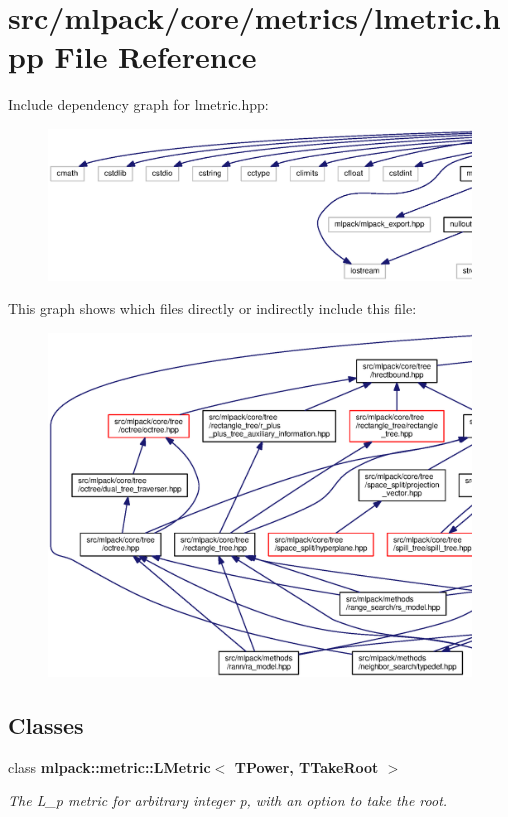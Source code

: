 \section{src/mlpack/core/metrics/lmetric.hpp File Reference}
\label{lmetric_8hpp}
Include dependency graph for lmetric.\+hpp\+:
\nopagebreak
\begin{figure}[H]
\begin{center}
\leavevmode
\includegraphics[width=350pt]{lmetric_8hpp__incl}
\end{center}
\end{figure}
This graph shows which files directly or indirectly include this file\+:
\nopagebreak
\begin{figure}[H]
\begin{center}
\leavevmode
\includegraphics[width=350pt]{lmetric_8hpp__dep__incl}
\end{center}
\end{figure}
\subsection*{Classes}
\begin{DoxyCompactItemize}
\item 
class {\bf mlpack\+::metric\+::\+L\+Metric$<$ T\+Power, T\+Take\+Root $>$}
\begin{DoxyCompactList}\small\item\em The L\+\_\+p metric for arbitrary integer p, with an option to take the root. \end{DoxyCompactList}\end{DoxyCompactItemize}
